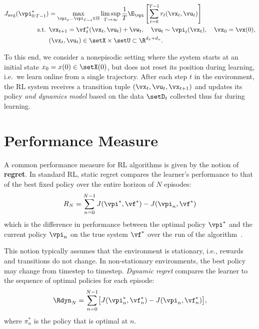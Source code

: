 \begin{problem}
\label{pr:non-episodic}
\begin{align}
    J_{\text{avg}}(\vpi^{*}_{0:T-1}) &= \max_{\vpi_0\ldots\vpi_{T-1} \in \Pi} \limsup_{T \to \infty} \frac{1}{T} \E_{\vpi} \left[ \sum^{T-1}_{t=0} r_t(\vx_t, \vu_t) \right]
        \label{eq:average_reward}\\
    \textrm{s.t. }&\vx_{t+1} = \vf^*_t(\vx_{t}, \vu_{t}) + \vw_t, \quad \vu_t \sim \vpi_t(\vx_t), \quad \vx_0 = \vx(0), \notag \\
    & (\vx_t, \vu_t) \in \setX \times \setU \subset \R^{d_x+d_u}.\notag
\end{align}
\end{problem}


To this end, we consider a nonepisodic setting where the system starts at an initial state $x_0=x(0)\in\setX(0)$, but does not reset its position during learning, i.e.~we learn online from a single trajectory. After each step $t$ in the environment, the RL system receives a transition tuple $(\vx_t, \vu_t, \vx_{t+1})$ and updates its policy \textit{and dynamics model} based on the data $\setD_t$ collected thus far during learning. %

\section{Performance Measure}

A common performance measure for RL algorithms is given by the notion of \textbf{regret}.
In standard RL, static regret compares the learner’s performance to that of the best fixed policy over the entire horizon of $N$ episodes:
\begin{equation}
    R_N=\sum_{n=0}^{N-1} J(\vpi^*,\vf^*)-J(\vpi_n,\vf^*)
    \label{eq:episodic_static_regret}
\end{equation}
which is the difference in performance between the optimal policy $\vpi^*$ and the current policy $\vpi_n$ on the true system $\vf^*$ over the run of the algorithm~\citep{chowdhury_online_2019}.

This notion typically assumes that the environment is stationary, i.e., rewards and transitions do not change. In non-stationary environments, the best policy may change from timestep to timestep. 
\emph{Dynamic regret} compares the learner to the sequence of optimal policies for each episode:\\
\begin{equation}
    \Rdyn_N = \sum_{n=0}^{N-1} \bigl[ J(\vpi_n^*, \vf_n^*) - J(\vpi_n, \vf_n^*) \bigr],
    \label{eq:episodic_dynamic_regret}
\end{equation}
where $\pi_n^{*}$ is the policy that is optimal at $n$.

